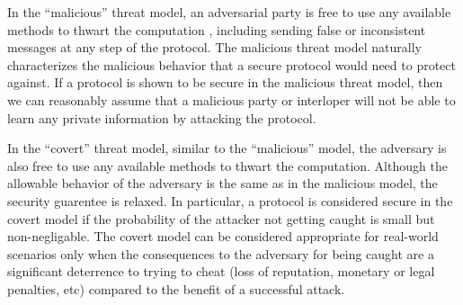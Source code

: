 In the {}``malicious'' threat model, an adversarial party is free
to use any available methods to thwart the computation , including
sending false or inconsistent messages at any step of the protocol.
The malicious threat model naturally characterizes the malicious behavior
that a secure protocol would need to protect against. If a protocol
is shown to be secure in the malicious threat model, then we can reasonably
assume that a malicious party or interloper will not be able to learn
any private information by attacking the protocol.

In the {}``covert'' threat model, similar to the {}``malicious'' model,
the adversary is also free to use any available methods to thwart the computation.
Although the allowable behavior of the adversary is the same as in the malicious model, the 
security guarentee is relaxed.  In particular, a protocol is considered secure
in the covert model if the probability of the attacker not getting caught
is small but non-negligable.  The covert model can be considered appropriate
for real-world scenarios only when the consequences to the adversary for being
caught are a significant deterrence to trying to cheat (\ie loss of reputation,
monetary or legal penalties, etc) compared to the benefit of a successful attack.
\cite{aumannlindell}

%
\begin{comment}



\end{comment}
{}
